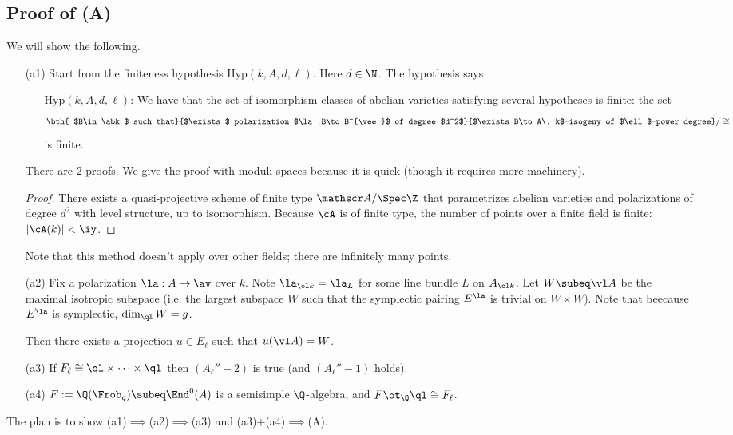 \subsection{Proof of (A)}
We will show the following.
\begin{enumerate}
\item[(a1)] Start from the finiteness hypothesis $\text{Hyp}(k,A,d,\ell)$. Here $d\in \N$. The hypothesis says 
\begin{enumerate}
\item[$\text{Hyp}(k,A,d,\ell)$:] We have that the set of isomorphism classes of abelian varieties satisfying several hypotheses is finite: the set
\[
\bth{
$B\in \abk$ such that}
{$\exists$
polarization $\la:B\to B^{\vee}$ of degree $d^2$}
{$\exists B\to A\, k$-isogeny of $\ell$-power degree}/\cong
\]
is finite.
\end{enumerate}
There are 2 proofs. We give the proof with moduli spaces because it is quick (though it requires more machinery).
\begin{proof}
There exists a quasi-projective scheme of finite type $\mathscr A/\Spec \Z$ that parametrizes abelian varieties and polarizations of degree $d^2$ with level structure, up to isomorphism. Because $\cA$ is of finite type, the number of points over a finite field is finite: $|\cA(k)|<\iy$. %
\end{proof}
Note that this method doesn't apply over other fields; there are infinitely many points.
\item[(a2)] Fix a polarization $\la:A\to \av$ over $k$. Note $\la_{\ol k}=\la_L$ for some line bundle $L$ on $A_{\ol k}$. Let $W\subeq \vl A$ be the maximal isotropic subspace (i.e. the largest subspace $W$ such that the symplectic pairing $E^{\la}$ is trivial on $W\times W$). 
Note that beecause $E^{\la}$ is symplectic, $\dim_{\ql} W =g$.

Then there exists a projection $u\in E_{\ell}$ such that $u(\vl A)=W$.
\item[(a3)] If $F_{\ell}\cong \ql\times \cdots \times \ql$ then $(A_{\ell}''-2)$ is true (and $(A_{\ell}''-1)$ holds).
\item[(a4)] %
$F:=\Q(\Frob_q)\subeq \End^0(A)$ is a semisimple $\Q$-algebra, and $F\ot_{\Q}\ql \cong F_{\ell}$. %
\end{enumerate}
The plan is to show (a1)$\implies$(a2)$\implies$(a3) and (a3)$+$(a4)$\implies$(A). 

